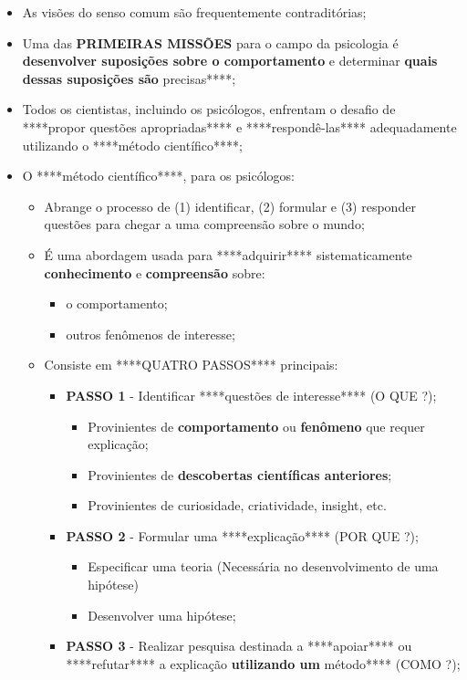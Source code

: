 \documentclass[
]{book}
\providecommand{\tightlist}{%
  \setlength{\itemsep}{0pt}\setlength{\parskip}{0pt}}
\begin{document}
\begin{itemize}
\tightlist
\item
  As visões do senso comum são frequentemente contraditórias;
\item
  Uma das \textbf{PRIMEIRAS MISSÕES} para o campo da psicologia é \textbf{desenvolver suposições sobre o comportamento} e determinar \textbf{quais dessas suposições são }precisas****;
\item
  Todos os cientistas, incluindo os psicólogos, enfrentam o desafio de ****propor questões apropriadas**** e ****respondê-las**** adequadamente utilizando o ****método científico****;
\item
  O ****método científico****, para os psicólogos:

  \begin{itemize}
  \tightlist
  \item
    Abrange o processo de (1) identificar, (2) formular e (3) responder questões para chegar a uma compreensão sobre o mundo;
  \item
    É uma abordagem usada para ****adquirir**** sistematicamente \textbf{conhecimento} e \textbf{compreensão} sobre:

    \begin{itemize}
    \tightlist
    \item
      o comportamento;
    \item
      outros fenômenos de interesse;
    \end{itemize}
  \item
    Consiste em ****QUATRO PASSOS**** principais:

    \begin{itemize}
    \tightlist
    \item
      \textbf{PASSO 1} - Identificar ****questões de interesse**** (O QUE ?);

      \begin{itemize}
      \tightlist
      \item
        Provinientes de \textbf{comportamento} ou \textbf{fenômeno} que requer explicação;
      \item
        Provinientes de \textbf{descobertas científicas anteriores};
      \item
        Provinientes de curiosidade, criatividade, insight, etc.
      \end{itemize}
    \item
      \textbf{PASSO 2} - Formular uma ****explicação**** (POR QUE ?);

      \begin{itemize}
      \tightlist
      \item
        Especificar uma teoria (Necessária no desenvolvimento de uma hipótese)
      \item
        Desenvolver uma hipótese;\\
      \end{itemize}
    \item
      \textbf{PASSO 3} - Realizar pesquisa destinada a ****apoiar**** ou ****refutar**** a explicação \textbf{utilizando um }método**** (COMO ?);


\end{itemize}
\end{itemize}
\end{itemize}
\end{document}
